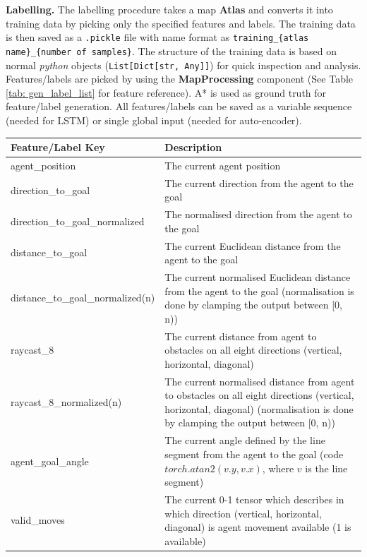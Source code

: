 \clearpage

\textbf{Labelling.} The labelling procedure takes a map \textbf{Atlas} and converts it into training data by picking only the specified features and labels. The training data is then saved as a \texttt{.pickle} file with name format as \texttt{training\_\{atlas name\}\_\{number of samples\}}. The structure of the training data is based on normal \textit{python} objects (\texttt{List[Dict[str, Any]]}) for quick inspection and analysis. Features/labels are picked by using the \textbf{MapProcessing} component (See Table \ref{tab: gen_label_list} for feature reference). A* is used as ground truth for feature/label generation. All features/labels can be saved as a variable sequence (needed for LSTM) or single global input (needed for auto-encoder).

\begin{table}[h!]
    \centerfloat
    \begin{tabular}{|M{5cm}|M{9cm}|}
        \hline
        \textbf{Feature/Label Key} &  \textbf{Description} \\
        \hline
        agent\_position & The current agent position \\
        \hline
        direction\_to\_goal & The current direction from the agent to the goal \\
        \hline
        direction\_to\_goal\_normalized & The normalised direction from the agent to the goal \\
        \hline
        distance\_to\_goal & The current Euclidean distance from the agent to the goal\\
        \hline
        distance\_to\_goal\_normalized(n) & The current normalised Euclidean distance from the agent to the goal (normalisation is done by clamping the output between [0, n))\\
        \hline
        raycast\_8 & The current distance from agent to obstacles on all eight directions (vertical, horizontal, diagonal) \\
        \hline
        raycast\_8\_normalized(n) & The current normalised distance from agent to obstacles on all eight directions (vertical, horizontal, diagonal) (normalisation is done by clamping the output between [0, n)) \\
        \hline
        agent\_goal\_angle & The current angle defined by the line segment from the agent to the goal (code $torch.atan2(v.y, v.x)$, where $v$ is the line segment)\\
        \hline
        valid\_moves & The current 0-1 tensor which describes in which direction (vertical, horizontal, diagonal) is agent movement available (1 is available) \\

\end{tabular}
\end{table}
